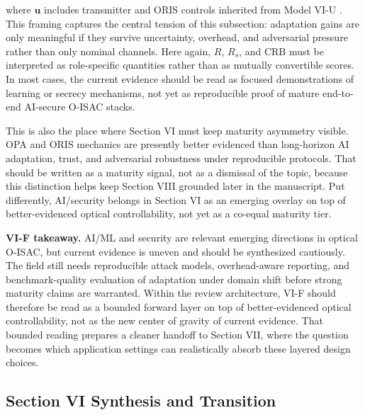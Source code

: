 where $\mathbf{u}$ includes transmitter and ORIS controls inherited from Model VI-U \cite{O_ISAC_127,O_ISAC_145,O_ISAC_163}. This framing captures the central tension of this subsection: adaptation gains are only meaningful if they survive uncertainty, overhead, and adversarial pressure rather than only nominal channels. Here again, $R$, $R_s$, and $\mathrm{CRB}$ must be interpreted as role-specific quantities rather than as mutually convertible scores. In most cases, the current evidence should be read as focused demonstrations of learning or secrecy mechanisms, not yet as reproducible proof of mature end-to-end AI-secure O-ISAC stacks.

This is also the place where Section VI must keep maturity asymmetry visible. OPA and ORIS mechanics are presently better evidenced than long-horizon AI adaptation, trust, and adversarial robustness under reproducible protocols. That should be written as a maturity signal, not as a dismissal of the topic, because this distinction helps keep Section VIII grounded later in the manuscript. Put differently, AI/security belongs in Section VI as an emerging overlay on top of better-evidenced optical controllability, not yet as a co-equal maturity tier.

\textbf{VI-F takeaway.} AI/ML and security are relevant emerging directions in optical O-ISAC, but current evidence is uneven and should be synthesized cautiously. The field still needs reproducible attack models, overhead-aware reporting, and benchmark-quality evaluation of adaptation under domain shift before strong maturity claims are warranted. Within the review architecture, VI-F should therefore be read as a bounded forward layer on top of better-evidenced optical controllability, not as the new center of gravity of current evidence. That bounded reading prepares a cleaner handoff to Section VII, where the question becomes which application settings can realistically absorb these layered design choices.

\subsection{Section VI Synthesis and Transition}

